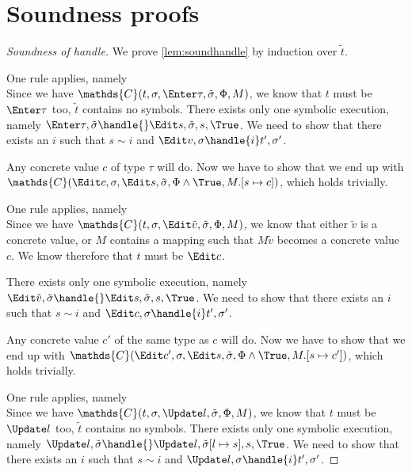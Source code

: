 
\section{Soundness proofs}
\label{sec:soundnessproofs}

\begin{proof}[Soundness of handle]

  We prove \cref{lem:soundhandle} by induction over $\tilde{t}$.

 {One rule applies, namely \\
 Since we have $\mathds{C}(t,\sigma,\Enter \tau,\tilde{\sigma},\Phi,M)$, we know that $t$ must be $\Enter \tau$ too, $\tilde{t}$ contains no symbols.
 There exists only one symbolic execution, namely $\Enter \tau,\tilde{\sigma}\handle{}\Edit s,\tilde{\sigma},s,\True$.
 We need to show that there exists an $i$ such that $s\sim i$ and $\Edit v,\sigma\handle{i}t',\sigma'$.

 Any concrete value $c$ of type $\tau$ will do. Now we have to show that we end up with $\mathds{C}(\Edit c,\sigma,\Edit s,\tilde{\sigma},\Phi\land\True,M.[s\mapsto c])$, which holds trivially.
 }

  {One rule applies, namely \\
  Since we have $\mathds{C}(t,\sigma,\Edit \tilde{v},\tilde{\sigma},\Phi,M)$, we know that either $\tilde{v}$ is a concrete value, or $M$ contains a mapping such that $M\tilde{v}$ becomes a concrete value $c$. We know therefore that $t$ must be $\Edit c$.

  There exists only one symbolic execution, namely $\Edit \tilde{v},\tilde{\sigma}\handle{}\Edit s,\tilde{\sigma},s,\True$.
  We need to show that there exists an $i$ such that $s\sim i$ and $\Edit c,\sigma\handle{i}t',\sigma'$.

  Any concrete value $c'$ of the same type as $c$ will do. Now we have to show that we end up with $\mathds{C}(\Edit c',\sigma,\Edit s,\tilde{\sigma},\Phi\land\True,M.[s\mapsto c'])$, which holds trivially.
  }


{One rule applies, namely \\

Since we have $\mathds{C}(t,\sigma,\Update l,\tilde{\sigma},\Phi,M)$, we know that $t$ must be $\Update l$ too, $\tilde{t}$ contains no symbols.
There exists only one symbolic execution, namely $\Update l,\tilde{\sigma}\handle{}\Update l,\tilde{\sigma}[l\mapsto s],s,\True$.
We need to show that there exists an $i$ such that $s\sim i$ and $\Update l,\sigma\handle{i}t',\sigma'$.

}
\end{proof}
